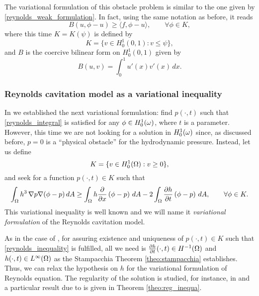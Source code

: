 The variational formulation of this obstacle problem is similar to the one given by \eqref{reynolds_weak_formulation}. In fact, using the same notation as before, it reads
\begin{equation}
B(u,\phi-u)\geq\langle f,\phi-u\rangle,\qquad\forall \phi \in K,
\end{equation}
where this time $K=K(\psi)$ is defined by $$K=\{v\in H_0^1\left(0,1\right):v\leq \psi \},$$
and $B$ is the coercive bilinear form on $H_0^1\left(0,1\right)$ given by
$$B(u,v)=\int_0^1 u'(x)v'(x)\,dx.$$

\subsubsection*{Reynolds cavitation model as a variational inequality}
In  we established the next variational formulation: find $p(\cdot,t)$ such that \eqref{reynolds_integral} is satisfied for any $\phi \in {H_0^1(\omega)}$, where $t$ is a parameter. However, this time we are not looking for a solution in ${H_0^1(\omega)}$ since, as discussed before, $p=0$ is a ``physical obstacle'' for the hydrodynamic pressure. Instead, let us define 
\begin{equation}
K=\{v\in \hzerooneOm :v\geq 0\},\label{eq:definition_K}
\end{equation}
and seek for a function $p(\cdot,t)\in K$ such that 
\begin{align}
\int_\Omega h^3\,\nabla p \nabla(\phi-p)\,dA \geq\int_\Omega h\frac{\partial }{\partial x}\left(\phi-p\right)\,dA-2\int_\Omega\parder{h}{t}\left(\phi-p\right)\,dA,\qquad \forall \phi \in K.\label{eq:reynolds_inequality}
\end{align}
This variational inequality is well known \cite{cimatti1976,kinderlehrer1980} and we will name it \emph{variational formulation} of the Reynolds cavitation model.

As in the case of , for assuring existence and uniqueness of $p(\cdot,t)\in K$ such that \eqref{reynolds_inequality} is fulfilled, all we need is $\frac{\partial h}{\partial t}(\cdot,t)\in H^{-1}(\Omega)$ and $h(\cdot,t)\in {L^{\infty}(\Omega)}$ as the Stampacchia Theorem \ref{theo:stampacchia} establishes. Thus, we can relax the hypothesis on $h$ for the variational formulation of Reynolds equation. The regularity of the solution is studied, for instance, in \cite{kinderlehrer1980}  and a particular result due to   \citeauthor{rodrigues1987} \cite{rodrigues1987} is given in Theorem \ref{theo:reg_inequa}.


